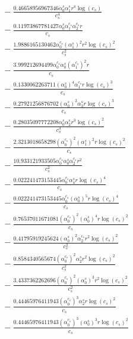 \documentclass[10pt]{article}
\begin{document}
\begin{align*}
&{}  - \frac{0.46658956967346 \alpha_{0}^s \alpha_{1}^s r^{4} \log{\left(c_{s} \right)}}{c_{s}^{4}} \\
&{}  - \frac{0.11973867781427 \alpha_{0}^s \alpha_{1}^{c_s} \alpha_{2}^{c_s} r}{c_{s}} \\
&{}  - \frac{1.9886165130462 \alpha_{0}^{c_s} \left(\alpha_{1}^s\right)^{2} r^{2} \log{\left(c_{s} \right)}^{2}}{c_{s}^{2}} \\
&{}  - \frac{3.999212694499 \alpha_{0}^{c_s} \alpha_{0}^s \left(\alpha_{1}^{c_s}\right)^{2} r}{c_{s}} \\
&{}  - \frac{0.1330062263711 \left(\alpha_{0}^s\right)^{4} \alpha_{1}^{c_s} r \log{\left(c_{s} \right)}^{3}}{c_{s}} \\
&{}  - \frac{0.27921256876702 \left(\alpha_{0}^s\right)^{2} \alpha_{3}^s r \log{\left(c_{s} \right)}^{3}}{c_{s}} \\
&{}  - \frac{0.28035097772208 \alpha_{0}^s \alpha_{2}^s r^{3} \log{\left(c_{s} \right)}^{2}}{c_{s}^{3}} \\
&{}  - \frac{2.3213018658298 \left(\alpha_{0}^{c_s}\right)^{2} \left(\alpha_{1}^s\right)^{2} r \log{\left(c_{s} \right)}^{2}}{c_{s}} \\
&{}  - \frac{10.933121933505 \alpha_{0}^{c_s} \alpha_{0}^s \alpha_{2}^{c_s} r^{2}}{c_{s}^{2}} \\
&{}  - \frac{0.022241473153445 \alpha_{0}^{c_s} \alpha_{4}^s r \log{\left(c_{s} \right)}^{4}}{c_{s}} \\
&{}  - \frac{0.022241473153445 \alpha_{0}^{c_s} \left(\alpha_{0}^s\right)^{5} r \log{\left(c_{s} \right)}^{4}}{c_{s}} \\
&{}  - \frac{0.76537011671081 \left(\alpha_{0}^{c_s}\right)^{2} \left(\alpha_{0}^s\right)^{4} r \log{\left(c_{s} \right)}^{2}}{c_{s}} \\
&{}  - \frac{0.41795919245624 \left(\alpha_{0}^s\right)^{2} \alpha_{2}^{c_s} r^{2} \log{\left(c_{s} \right)}^{2}}{c_{s}^{2}} \\
&{}  - \frac{0.8584340565674 \left(\alpha_{0}^{c_s}\right)^{2} \alpha_{2}^s r^{2} \log{\left(c_{s} \right)}^{2}}{c_{s}^{2}} \\
&{}  - \frac{3.4337362262696 \left(\alpha_{0}^{c_s}\right)^{2} \left(\alpha_{0}^s\right)^{3} r^{2} \log{\left(c_{s} \right)}^{2}}{c_{s}^{2}} \\
&{}  - \frac{0.44465976411943 \left(\alpha_{0}^{c_s}\right)^{3} \alpha_{2}^s r \log{\left(c_{s} \right)}^{2}}{c_{s}} \\
&{}  - \frac{0.44465976411943 \left(\alpha_{0}^{c_s}\right)^{3} \left(\alpha_{0}^s\right)^{3} r \log{\left(c_{s} \right)}^{2}}{c_{s}} \\

\end{align*}
\end{document}
